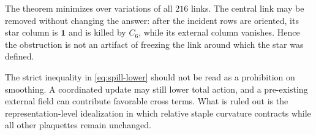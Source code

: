 The theorem minimizes over variations of all $216$ links.  The central link
may be removed without changing the answer: after the incident rows are
oriented, its star column is $\mathbf1$ and is killed by $C_6$, while its
external column vanishes.  Hence the obstruction is not an artifact of
freezing the link around which the star was defined.

The strict inequality in \eqref{eq:spill-lower} should not be read as a
prohibition on smoothing.  A coordinated update may still lower total action,
and a pre-existing external field can contribute favorable cross terms.  What
is ruled out is the representation-level idealization in which relative
staple curvature contracts while all other plaquettes remain unchanged.
